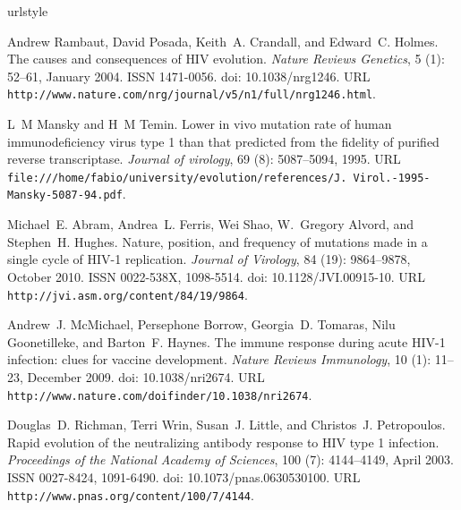\documentclass[11pt]{article}
\begin{document}
%
%

\begin{thebibliography}{48}
\providecommand{\natexlab}[1]{#1}
\providecommand{\url}[1]{\texttt{#1}}
\expandafter\ifx\csname urlstyle\endcsname\relax
  \providecommand{\doi}[1]{doi: #1}\else
  \providecommand{\doi}{doi: \begingroup \urlstyle{rm}\Url}\fi

Andrew Rambaut, David Posada, Keith~A. Crandall, and Edward~C. Holmes.
\newblock The causes and consequences of {HIV} evolution.
\newblock \emph{Nature Reviews Genetics}, 5 (1): 52--61,
  January 2004.
\newblock ISSN 1471-0056.
\newblock \doi{10.1038/nrg1246}.
\newblock URL \url{http://www.nature.com/nrg/journal/v5/n1/full/nrg1246.html}.

L~M Mansky and H~M Temin.
\newblock Lower in vivo mutation rate of human immunodeficiency virus type 1
  than that predicted from the fidelity of purified reverse transcriptase.
\newblock \emph{Journal of virology}, 69 (8): 5087--5094,
  1995.
\newblock URL \url{file:///home/fabio/university/evolution/references/J.
  Virol.-1995-Mansky-5087-94.pdf}.

Michael~E. Abram, Andrea~L. Ferris, Wei Shao, W.~Gregory Alvord, and Stephen~H.
  Hughes.
\newblock Nature, position, and frequency of mutations made in a single cycle
  of {HIV-1} replication.
\newblock \emph{Journal of Virology}, 84 (19): 9864--9878,
  October 2010.
\newblock ISSN 0022-{538X}, 1098-5514.
\newblock \doi{10.1128/JVI.00915-10}.
\newblock URL \url{http://jvi.asm.org/content/84/19/9864}.

Andrew~J. {McMichael}, Persephone Borrow, Georgia~D. Tomaras, Nilu
  Goonetilleke, and Barton~F. Haynes.
\newblock The immune response during acute {HIV-1} infection: clues for vaccine
  development.
\newblock \emph{Nature Reviews Immunology}, 10 (1): 11--23,
  December 2009.
\newblock \doi{10.1038/nri2674}.
\newblock URL \url{http://www.nature.com/doifinder/10.1038/nri2674}.

Douglas~D. Richman, Terri Wrin, Susan~J. Little, and Christos~J. Petropoulos.
\newblock Rapid evolution of the neutralizing antibody response to {HIV} type 1
  infection.
\newblock \emph{Proceedings of the National Academy of Sciences}, 100
  (7): 4144--4149, April 2003.
\newblock ISSN 0027-8424, 1091-6490.
\newblock \doi{10.1073/pnas.0630530100}.
\newblock URL \url{http://www.pnas.org/content/100/7/4144}.


\end{thebibliography}
\end{document}
